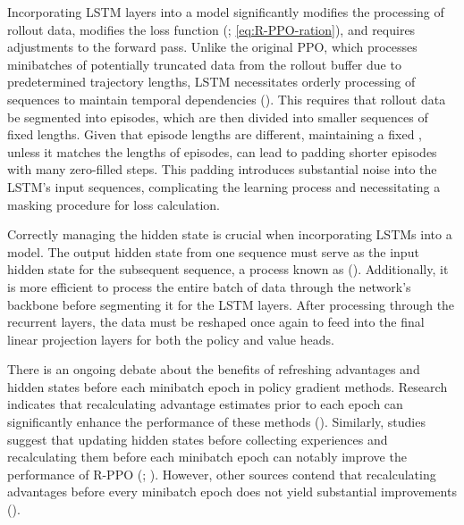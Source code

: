 \noindent Incorporating LSTM layers into a model significantly modifies the processing of rollout data, modifies the loss function (\textcolor{deepblue}{\cite{pleines2022generalization}; \autoref{eq:R-PPO-ration}}), and requires adjustments to the forward pass. Unlike the original PPO, which processes minibatches of potentially truncated data from the rollout buffer due to predetermined trajectory lengths, LSTM necessitates orderly processing of sequences to maintain temporal dependencies (\textcolor{deepblue}{\cite{shengyi2022the37implementation}}). This requires that rollout data be segmented into episodes, which are then divided into smaller sequences of fixed lengths. Given that episode lengths are different, maintaining a fixed , unless it matches the lengths of episodes, can lead to padding shorter episodes with many zero-filled steps. This padding introduces substantial noise into the LSTM's input sequences, complicating the learning process and necessitating a masking procedure for loss calculation.

\bigskip

\noindent Correctly managing the hidden state is crucial when incorporating LSTMs into a model. The output hidden state from one sequence must serve as the input hidden state for the subsequent sequence, a process known as  (\textcolor{deepblue}{\cite{tallec2017unbiasing}}). Additionally, it is more efficient to process the entire batch of data through the network's backbone before segmenting it for the LSTM layers. After processing through the recurrent layers, the data must be reshaped once again to feed into the final linear projection layers for both the policy and value heads.

\bigskip

\noindent There is an ongoing debate about the benefits of refreshing advantages and hidden states before each minibatch epoch in policy gradient methods. Research indicates that recalculating advantage estimates prior to each epoch can significantly enhance the performance of these methods (\textcolor{deepblue}{\cite{andrychowicz2021what}}). Similarly, studies suggest that updating hidden states before collecting experiences and recalculating them before each minibatch epoch can notably improve the performance of R-PPO (\textcolor{deepblue}{\cite{kapturowski2018recurrent}; \cite{GuptaRecurrentPPO}}). However, other sources contend that recalculating advantages before every minibatch epoch does not yield substantial improvements (\textcolor{deepblue}{\cite{pleines2022generalization}}).

